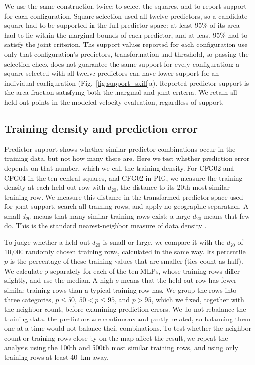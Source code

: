 \documentclass[review,jog]{igs}
\begin{document}
We use the same construction twice: to select the squares, and to report support for each configuration. Square selection used all twelve predictors, so a candidate square had to be supported in the full predictor space: at least 95\% of its area had to lie within the marginal bounds of each predictor, and at least 95\% had to satisfy the joint criterion. The support values reported for each configuration use only that configuration's predictors, transformation and threshold, so passing the selection check does not guarantee the same support for every configuration: a square selected with all twelve predictors can have lower support for an individual configuration (Fig.~\ref{fig:support_skill}a). Reported predictor support is the area fraction satisfying both the marginal and joint criteria. We retain all held-out points in the modeled velocity evaluation, regardless of support.

\subsection{Training density and prediction error}
\label{app:training_representation}

Predictor support shows whether similar predictor combinations occur in the training data, but not how many there are. Here we test whether prediction error depends on that number, which we call the training density. For CFG02 and CFG04 in the ten central squares, and CFG02 in PIG, we measure the training density at each held-out row with $d_{20}$, the distance to its 20th-most-similar training row. We measure this distance in the transformed predictor space used for joint support, search all training rows, and apply no geographic separation. A small $d_{20}$ means that many similar training rows exist; a large $d_{20}$ means that few do. This is the standard nearest-neighbor measure of data density \citep{loftsgaarden1965nonparametric}.

To judge whether a held-out $d_{20}$ is small or large, we compare it with the $d_{20}$ of 10,000 randomly chosen training rows, calculated in the same way. Its percentile $p$ is the percentage of these training values that are smaller (ties count as half). We calculate $p$ separately for each of the ten MLPs, whose training rows differ slightly, and use the median. A high $p$ means that the held-out row has fewer similar training rows than a typical training row has. We group the rows into three categories, $p\leq50$, $50<p\leq95$, and $p>95$, which we fixed, together with the neighbor count, before examining prediction errors. We do not rebalance the training data: the predictors are continuous and partly related, so balancing them one at a time would not balance their combinations. To test whether the neighbor count or training rows close by on the map affect the result, we repeat the analysis using the 100th and 500th most similar training rows, and using only training rows at least 40~km away.
\end{document}
